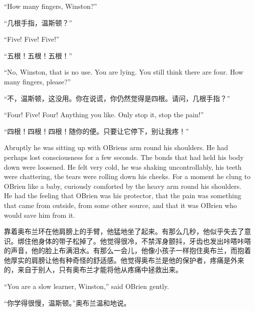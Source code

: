 \begin{paracol}{2}
\switchcolumn*

``How many fingers, Winston?''

\switchcolumn

``几根手指，温斯顿？''

\switchcolumn*

``Five! Five! Five!''

\switchcolumn

``五根！五根！五根！''

\switchcolumn*

``No, Winston, that is no use. You are lying. You still think there are
four. How many fingers, please?''

\switchcolumn

``不，温斯顿，这没用。你在说谎，你仍然觉得是四根。请问，几根手指？''

\switchcolumn*

``Four! Five! Four! Anything you like. Only stop it, stop the pain!''

\switchcolumn

``四根！四根！四根！随你的便。只要让它停下，别让我疼！''

\switchcolumn*

Abruptly he was sitting up with
O\textquotesingle Brien\textquotesingle s arm round his shoulders. He
had perhaps lost consciousness for a few seconds. The bonds that had
held his body down were loosened. He felt very cold, he was shaking
uncontrollably, his teeth were chattering, the tears were rolling down
his cheeks. For a moment he clung to O\textquotesingle Brien like a
baby, curiously comforted by the heavy arm round his shoulders. He had
the feeling that O\textquotesingle Brien was his protector, that the
pain was something that came from outside, from some other source, and
that it was O\textquotesingle Brien who would save him from it.

\switchcolumn

靠着奥布兰环在他肩膀上的手臂，他猛地坐了起来。有那么几秒，他似乎失去了意识。绑住他身体的带子松掉了。他觉得很冷，不禁浑身颤抖，牙齿也发出咔嗒咔嗒的声音，他的脸上布满泪水。有那么一会儿，他像小孩子一样抱住奥布兰，而抱着他厚实的肩膀让他有种奇怪的舒适感。他觉得奥布兰是他的保护者，疼痛是外来的，来自于别人，只有奥布兰才能将他从疼痛中拯救出来。

\switchcolumn*

``You are a slow learner, Winston,'' said O\textquotesingle Brien gently.

\switchcolumn

``你学得很慢，温斯顿。''奥布兰温和地说。


\end{paracol}

